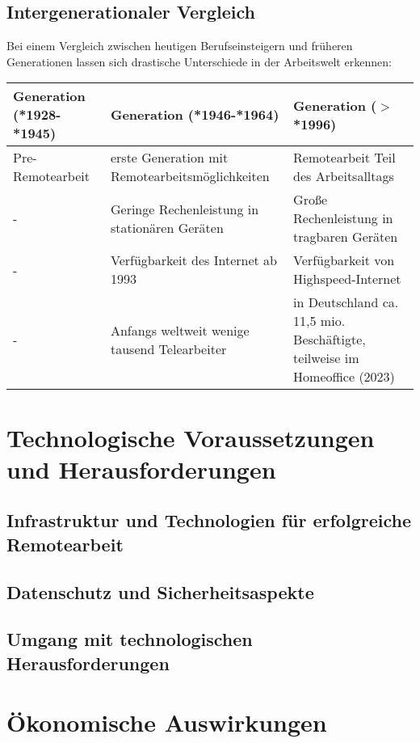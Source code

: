 \documentclass[runningheads]{llncs}
\begin{document}
\subsection{Intergenerationaler Vergleich}
Bei einem Vergleich zwischen heutigen Berufseinsteigern und früheren Generationen lassen sich drastische Unterschiede in der Arbeitswelt erkennen:
\vspace{-\baselineskip}
\begin{center}
\begin{tabular}{ | m{13em} | m{13em}| m{13em} | } 
\hline
Generation (*1928-*1945) & Generation (*1946-*1964) & Generation ($>$*1996) \\
\hline
Pre-Remotearbeit & erste Generation mit Remotearbeitsmöglichkeiten & Remotearbeit Teil des Arbeits\-alltags\\
\hline
- & Geringe Rechenleistung in stationären Geräten & Große Rechenleistung in tragbaren Geräten\\
\hline
- & Verfügbarkeit des Internet ab 1993\cite{CERN} & Verfügbarkeit von Highspeed-Internet\\
\hline
- & Anfangs weltweit wenige tausend Telearbeiter\cite{heilmann1983softwareentwicklung} & in Deutschland ca. 11,5 mio. Beschäftigte, teilweise im Homeoffice (2023)\cite{statis24, ifo23}\\
\hline
\end{tabular}
\end{center}

\section{Technologische Voraussetzungen und Herausforderungen}

\subsection{Infrastruktur und Technologien für erfolgreiche Remotearbeit}

\subsection{Datenschutz und Sicherheitsaspekte}

\subsection{Umgang mit technologischen Herausforderungen}


\section{Ökonomische Auswirkungen}
\end{document}

